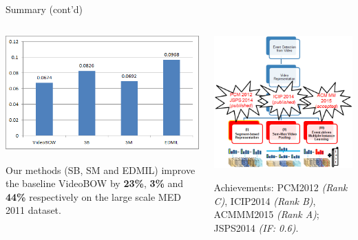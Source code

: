 \documentclass{beamer}
\begin{document}
\begin{frame}[t]{Summary (cont'd)}
	
	
	\bigskip
	
	\begin{columns}
		\begin{column}{0.5\textwidth}
			\centerline{\includegraphics[width=1\textwidth]{images/summary3.png}}
			\small{Our methods (SB, SM and EDMIL) improve the baseline VideoBOW by \textbf{23\%}, \textbf{3\%} and \textbf{44\%} respectively on the large scale MED 2011 dataset.}
		\end{column}
		
		\begin{column}{0.5\textwidth}
			\centerline{\includegraphics[width=1\textwidth]{images/summary2.png}}
			\small{Achievements: PCM2012 \textit{(Rank C)}, ICIP2014 \textit{(Rank B)}, ACMMM2015 \textit{(Rank A)}; JSPS2014 \textit{(IF: 0.6)}.}
		\end{column}
	\end{columns}
	\bigskip
	
	
\end{frame}

\begin{frame}[c]{}
	
\end{frame}
\end{document}
